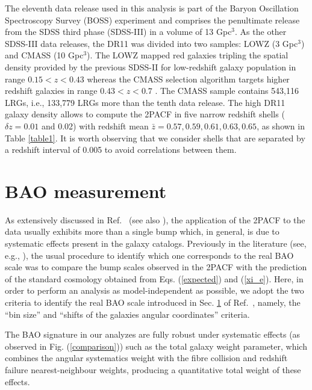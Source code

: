 \documentclass[a4paper,11pt]{article}
\begin{document}
The eleventh data release used in this analysis is part of the Baryon Oscillation Spectroscopy Survey (BOSS) experiment  and  comprises the penultimate release from the SDSS third phase (SDSS-III) in a volume of 13 Gpc$^3$. As the other SDSS-III  data releases, the DR11 was divided into two samples: LOWZ (3 Gpc$^3$) and CMASS (10 Gpc$^3$). The LOWZ mapped red galaxies tripling the spatial density provided by the previous SDSS-II for low-redshift galaxy population in range $ 0.15<z<0.43$ whereas the CMASS selection algorithm targets higher redshift galaxies in range $0.43 < z < 0.7$ \cite{Anderson14}.  The CMASS sample contains 543,116 LRGs, i.e., 133,779 LRGs more than the tenth data release. The high DR11 galaxy density allows to compute the 2PACF in five narrow redshift shells ($\delta z = 0.01$ and 0.02) with redshift mean  $\bar{z} = 0.57, 0.59, 0.61, 0.63, 0.65$, as shown in Table \ref{table1}. It is worth observing that we consider  shells that are separated by a redshift interval of 0.005 to avoid correlations between them. 



\section{ BAO measurement}
\label{sec4}

As extensively discussed in Ref.~\cite{Carvalho} (see also \cite{Alcaniz,deCarvalho}), the application of the 2PACF to the data usually exhibits more than a single bump which, in general, is due to systematic effects present in the galaxy catalogs. Previously in the literature (see, e.g., \cite{Carnero}), the usual procedure to identify which one corresponds to the real BAO scale was to compare the bump scales observed in the 2PACF with the prediction of the standard cosmology obtained from Eqs. (\ref{expected}) and (\ref{xi_e}).  Here, in order to perform an analysis as model-independent as possible, we adopt the two criteria to identify the real BAO scale introduced in Sec. \ref{sec4} of Ref.~\cite{Carvalho}, namely, the ``bin size'' and ``shifts of the galaxies angular coordinates'' criteria.

The BAO signature in our analyzes are fully robust under systematic effects (as observed in Fig. (\ref{comparison})) such as the total galaxy weight parameter, which combines the angular systematics weight with the fibre collision and redshift failure nearest-neighbour weights, producing a quantitative total weight of these effects.
\end{document}
